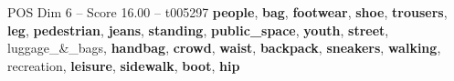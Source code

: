 \begin{textsample}{POS Dim 6 – Score 16.00 – t005297}  \label{ex:f6_pos_018}
\textbf{people}, \textbf{bag}, \textbf{footwear}, \textbf{shoe}, \textbf{trousers}, \textbf{leg}, \textbf{pedestrian}, \textbf{jeans}, \textbf{standing}, \textbf{public\_space}, \textbf{youth}, \textbf{street}, luggage\_\&\_bags, \textbf{handbag}, \textbf{crowd}, \textbf{waist}, \textbf{backpack}, \textbf{sneakers}, \textbf{walking}, recreation, \textbf{leisure}, \textbf{sidewalk}, \textbf{boot}, \textbf{hip}

\end{textsample}
